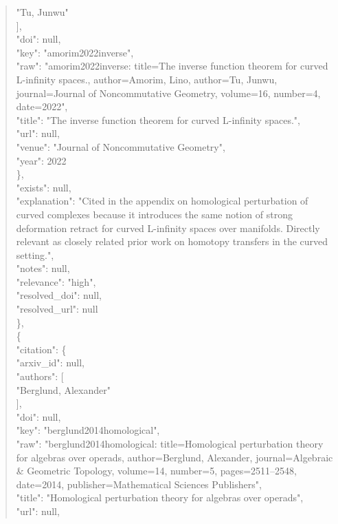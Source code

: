 \documentclass[11pt]{article}
\begin{document}
\begin{quote}
          "Tu, Junwu"\\
        ],\\
        "doi": null,\\
        "key": "amorim2022inverse",\\
        "raw": "amorim2022inverse: title=The inverse function theorem for curved L-infinity spaces., author=Amorim, Lino, author=Tu, Junwu, journal=Journal of Noncommutative Geometry, volume=16, number=4, date=2022",\\
        "title": "The inverse function theorem for curved L-infinity spaces.",\\
        "url": null,\\
        "venue": "Journal of Noncommutative Geometry",\\
        "year": 2022\\
      \},\\
      "exists": null,\\
      "explanation": "Cited in the appendix on homological perturbation of curved complexes because it introduces the same notion of strong deformation retract for curved L-infinity spaces over manifolds. Directly relevant as closely related prior work on homotopy transfers in the curved setting.",\\
      "notes": null,\\
      "relevance": "high",\\
      "resolved\_doi": null,\\
      "resolved\_url": null\\
    \},\\
    \{\\
      "citation": \{\\
        "arxiv\_id": null,\\
        "authors": [\\
          "Berglund, Alexander"\\
        ],\\
        "doi": null,\\
        "key": "berglund2014homological",\\
        "raw": "berglund2014homological: title=Homological perturbation theory for algebras over operads, author=Berglund, Alexander, journal=Algebraic \& Geometric Topology, volume=14, number=5, pages=2511--2548, date=2014, publisher=Mathematical Sciences Publishers",\\
        "title": "Homological perturbation theory for algebras over operads",\\
        "url": null,\\

\end{quote}
\end{document}
